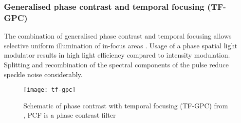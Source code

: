 \subsubsection{Generalised phase contrast and temporal focusing (TF-GPC)}
The combination of generalised phase contrast and temporal focusing
allows selective uniform illumination of in-focus areas
\citep{Papagiakoumou2010}. Usage of a phase spatial light modulator
results in high light efficiency compared to intensity modulation.
Splitting and recombination of the spectral components of the pulse
reduce speckle noise considerably.
\begin{figure}[!hbt]
  \centering
  \texttt{[image: tf-gpc]} 
  \caption{Schematic of phase contrast with temporal focusing (TF-GPC)
    from \citep{Papagiakoumou2010}, PCF is a phase contrast filter}
  \label{fig:tf-gpc}
\end{figure}
